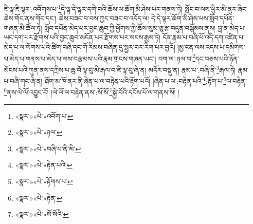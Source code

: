 ཇི་ལྟ་ཇི་ལྟར་:འབོགས་པ་\footnote{«སྣར་»«པེ་»འབོག་པ་}དེ་ལྟ་དེ་ལྟར་དགེ་བའི་ཆོས་ལ་ཆོག་མི་ཤེས་པར་གནས་ཏེ། སྤོང་བ་ལས་ཕྱིར་མི་ནུར་ཞིང་ཆེས་གོང་ནས་གོང་དང་། ཆེས་བཟང་བ་བས་ཀྱང་བཟང་བ་འདོད་ལ། དེ་དེ་ལྟར་ཆོག་མི་ཤེས་པས་སློབ་དཔོན་གཞན་མི་ཚོལ་ཏེ། སློབ་དཔོན་མེད་པར་བྱང་ཆུབ་ཀྱི་ཕྱོགས་ཀྱི་ཆོས་སུམ་ཅུ་རྩ་བདུན་བསྒོམས་ནས། བླ་ན་མེད་པ་ཡང་དག་པར་རྫོགས་པའི་བྱང་ཆུབ་མངོན་པར་རྫོགས་པར་སངས་རྒྱས་ཏེ། དོན་རྣམ་པ་བཞི་པོ་འདི་དག་འཛིན་པ་མེད་པ་ལ་སོགས་པའི་ཚིག་བཞི་དང་གོ་རིམས་བཞིན་དུ་སྦྱར་བར་རིག་པར་བྱའོ། །མྱ་ངན་ལས་འདས་པ་དམིགས་པ་མེད་པ་གནས་པ་མེད་པ་ལས་བརྩམས་པའི་རྣམ་གྲངས་གཞན་ཡང་། བག་ལ་:ཉལ་བ་\footnote{«སྣར་»«པེ་»ཉལ་}དང་བཅས་པའི་ཉོན་མོངས་པའི་ཀུན་ནས་དཀྲིས་པ་ཆུ་བོ་ལྟ་བུ་མི་རྒལ་བ་ཇི་ལྟ་བུ་ཞེ་ན། མདོར་བསྡུ་ན། རྣམ་པ་:བཞི་ནི་\footnote{«སྣར་»«པེ་»བཞི་པ་ནི་མི་}རྒལ་ཏེ། རྣམ་པ་བཞི་གང་ཞེ་ན། ཐོག་མ་ཁོ་ནར་ནི་ཞེན་པ་ལ་བརྟེན་པའི་རྟོག་པའོ། །ཞེན་པ་ལ་:བརྟེན་པའི་\footnote{«སྣར་»«པེ་»རྟེན་པའི་}:རྟོག་པ་\footnote{«སྣར་»«པེ་»རྟོགས་པ་}ལ་བརྟེན་\footnote{«སྣར་»«པེ་»རྟེན་}ནས་ལེ་ལོ་འབྱུང་ངོ། །ལེ་ལོ་ལ་བརྟེན་ནས་:སོ་སོ་\footnote{«སྣར་»«པེ་»སོ་སོའི་}སྐྱེ་བོའི་དངོས་པོ་ལ་གནས་སོ། །
